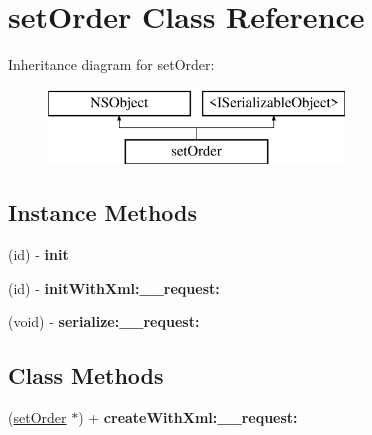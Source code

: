 \hypertarget{interfaceset_order}{}\section{set\+Order Class Reference}
\label{interfaceset_order}
Inheritance diagram for set\+Order\+:\begin{figure}[H]
\begin{center}
\leavevmode
\includegraphics[height=2.000000cm]{interfaceset_order}
\end{center}
\end{figure}
\subsection*{Instance Methods}
\begin{DoxyCompactItemize}
\item 
\hypertarget{interfaceset_order_a0d98ebf9efc30d1674793f266191c211}{}(id) -\/ {\bfseries init}\label{interfaceset_order_a0d98ebf9efc30d1674793f266191c211}

\item 
\hypertarget{interfaceset_order_ac1808e4c53ca6d5c49d9903993017214}{}(id) -\/ {\bfseries init\+With\+Xml\+:\+\_\+\+\_\+request\+:}\label{interfaceset_order_ac1808e4c53ca6d5c49d9903993017214}

\item 
\hypertarget{interfaceset_order_a7e0e91e3852e48dd5b440f8dbf61e61b}{}(void) -\/ {\bfseries serialize\+:\+\_\+\+\_\+request\+:}\label{interfaceset_order_a7e0e91e3852e48dd5b440f8dbf61e61b}

\end{DoxyCompactItemize}
\subsection*{Class Methods}
\begin{DoxyCompactItemize}
\item 
\hypertarget{interfaceset_order_a875695e012a19aa067fb492891f2e048}{}(\hyperlink{interfaceset_order}{set\+Order} $\ast$) + {\bfseries create\+With\+Xml\+:\+\_\+\+\_\+request\+:}\label{interfaceset_order_a875695e012a19aa067fb492891f2e048}

\end{DoxyCompactItemize}
